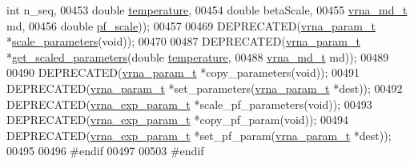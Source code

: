 \begin{DoxyCode}
{      int} n\_seq,
00453                                                        \textcolor{keywordtype}{double}       \hyperlink{group__energy__parameters_aeed2cd83713012bcb52e431041e037c8}{temperature},
00454                                                        \textcolor{keywordtype}{double}       betaScale,
00455                                                        \hyperlink{group__model__details_structvrna__md__s}{vrna\_md\_t}    md,
00456                                                        \textcolor{keywordtype}{double}       \hyperlink{group__model__details_gad3b22044065acc6dee0af68931b52cfd}{pf\_scale}));
00457 
00469 DEPRECATED(\hyperlink{group__energy__parameters_structvrna__param__s}{vrna\_param\_t} *\hyperlink{group__energy__parameters_ga541f2cf7436e9bc939b0a49b24baf987}{scale\_parameters}(\textcolor{keywordtype}{void}));
00470 
00487 DEPRECATED(\hyperlink{group__energy__parameters_structvrna__param__s}{vrna\_param\_t} *\hyperlink{group__energy__parameters_ga7fa6a000d7c16feab939f2c4ee626197}{get\_scaled\_parameters}(\textcolor{keywordtype}{double}     
      \hyperlink{group__energy__parameters_aeed2cd83713012bcb52e431041e037c8}{temperature},
00488                                                \hyperlink{group__model__details_structvrna__md__s}{vrna\_md\_t}  md));
00489 
00490 DEPRECATED(\hyperlink{group__energy__parameters_structvrna__param__s}{vrna\_param\_t} *copy\_parameters(\textcolor{keywordtype}{void}));
00491 DEPRECATED(\hyperlink{group__energy__parameters_structvrna__param__s}{vrna\_param\_t} *set\_parameters(\hyperlink{group__energy__parameters_structvrna__param__s}{vrna\_param\_t} *dest));
00492 DEPRECATED(\hyperlink{group__energy__parameters_structvrna__exp__param__s}{vrna\_exp\_param\_t} *scale\_pf\_parameters(\textcolor{keywordtype}{void}));
00493 DEPRECATED(\hyperlink{group__energy__parameters_structvrna__exp__param__s}{vrna\_exp\_param\_t} *copy\_pf\_param(\textcolor{keywordtype}{void}));
00494 DEPRECATED(\hyperlink{group__energy__parameters_structvrna__exp__param__s}{vrna\_exp\_param\_t} *set\_pf\_param(\hyperlink{group__energy__parameters_structvrna__param__s}{vrna\_param\_t} *dest));
00495 
00496 \textcolor{preprocessor}{#endif}
00497 
00503 \textcolor{preprocessor}{#endif}
\end{DoxyCode}
